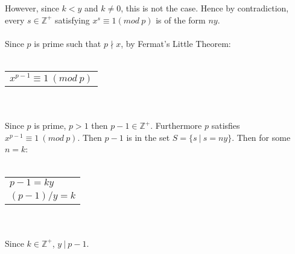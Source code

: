 \documentclass[12pt]{article}
\begin{document}
\\ \\
However, since $k < y$ and $k \neq 0$, this is not the case. Hence by contradiction, 
every $s \in \mathbb{Z^+}$ satisfying $x^s \equiv 1 (mod\ p)$ is of the form $ny$.
\\ \\
Since $p$ is prime such that $p \nmid x$, by Fermat's Little Theorem:
\\ \\
\begin{tabular}{l}
    $x^{p-1} \equiv 1\ (mod\ p)$\\
\end{tabular}
\\ \\
Since $p$ is prime, $p > 1$ then $p-1 \in \mathbb{Z^+}$. Furthermore $p$ satisfies $x^{p-1} \equiv 1\ (mod\ p)$.
Then $p-1$ is in the set $S=\{s\ |\ s=ny\}$. Then for some $n=k$:
\\ \\
\begin{tabular}{l}
    $p-1=ky$\\
    $(p-1)/y=k$\\
\end{tabular}
\\ \\
Since $k \in \mathbb{Z^+}$, $y\ |\ p-1$.
\end{document}
